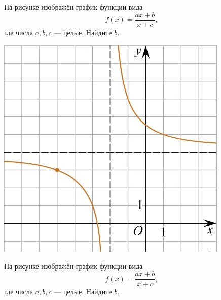 \begin{class}[number=10]
	\begin{listofex}
			\item
		\begin{minipage}[t]{\bodywidth}
			На рисунке изображён график функции вида \[ f(x)=\dfrac{ax+b}{x+c}, \] где числа \(a, b, c\) --- целые. Найдите \(b\).
		\end{minipage}
		\hspace{0.02\linewidth}
		\begin{minipage}[t]{\picwidth}
			\includegraphics[align=t, width=\linewidth]{../../pics/G101M4C6-5}
		\end{minipage}
		\item
		\begin{minipage}[t]{\bodywidth}
			На рисунке изображён график функции вида \[ f(x)=\dfrac{ax+b}{x+c}, \] где числа \(a, b, c\) --- целые. Найдите \(b\).
		\end{minipage}
		\hspace{0.02\linewidth}
		\begin{minipage}[t]{\picwidth}

\end{minipage}
\end{listofex}
\end{class}

